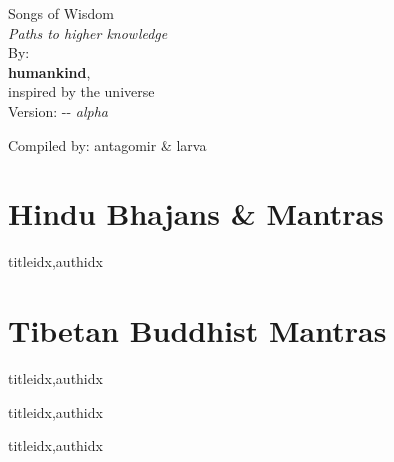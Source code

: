 \documentclass[twoside,10pt]{book}
\begin{document}
  \begin{titlepage}
    
    \thispagestyle{empty}
    \vspace*{\fill}    
    \begin{center}
      \Huge Songs of Wisdom\\
      \normalsize \textit{Paths to higher knowledge}\\
      \Large
      \vspace{3em}
      By:\\
      \textbf{humankind},\\
      inspired by the universe \\
      \vspace{1em}
      Version: \the\year-\the\month-\the\day \textit{ alpha}
    \end{center}
    \vspace*{\fill}
    \let\thefootnote\relax{\small Compiled by: antagomir \& larva}
  \end{titlepage}
  
  \tableofcontents %

  \clearpage\scleardpage
    \section{Hindu Bhajans \& Mantras} 
      \begin{songs}{titleidx,authidx}
        \setcounter{songnum}{100}
        
      \end{songs}
     \scleardpage
    \section{Tibetan Buddhist Mantras}
      \begin{songs}{titleidx,authidx}
        \setcounter{songnum}{170}
        
      \end{songs}  
  
  \clearpage\scleardpage
    \begin{songs}{titleidx,authidx}
      \setcounter{songnum}{200}
      
    \end{songs}
    
  \clearpage\scleardpage    
    \begin{songs}{titleidx,authidx}
      \setcounter{songnum}{300}
      
    \end{songs}
  
\end{document}
